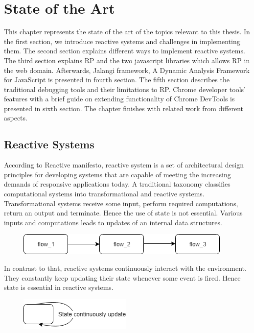\chapter{State of the Art} \label{chap:State of the Art}

This chapter represents the state of the art of the topics relevant to this thesis. In the first section, we introduce reactive systems and challenges in implementing them. The second section explains different ways to implement reactive systems. The third section explains RP and the two javascript libraries which allows RP in the web domain. Afterwards, Jalangi framework, A Dynamic Analysis Framework for JavaScript is presented in fourth section. The fifth section describes the traditional debugging tools and their limitations to RP. Chrome developer tools' features with a brief guide on extending functionality of Chrome DevTools is presented in sixth section. The chapter finishes with related work from different aspects.

\section{Reactive Systems}
According to Reactive manifesto\cite{reactiveManifesto}, reactive system is a set of architectural design principles for developing systems that are capable of meeting the increasing demands of responsive applications today. A traditional taxonomy classifies computational systems into transformational and reactive systems. Transformational systems receive some input, perform required computations, return an output and terminate. Hence the use of state is not essential. Various inputs and computations leads to updates of an internal data structures.

\begin{figure}[!h]
	\centering
	\includegraphics[scale=0.5,trim=0 0 0 0]{images/transformational-systems.png}
	\label{fig:transformational-systems}
\end{figure}

In contrast to that, reactive systems continuously interact with the environment. They constantly keep updating their state whenever some event is fired. Hence state is essential in reactive systems.

\begin{figure}[!h]
	\centering
	\includegraphics[scale=0.5,trim=0 0 0 0]{images/reactive-systems.png}
	\label{fig:reactive-systems}
\end{figure}

